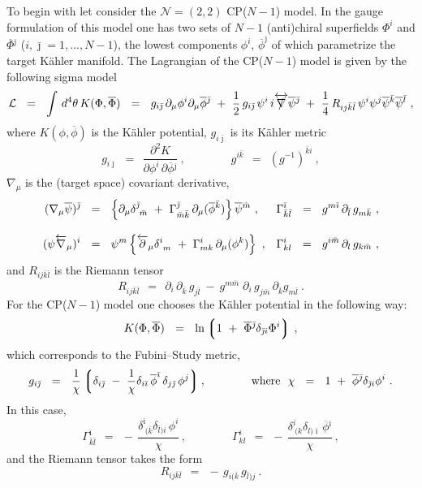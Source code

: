 \documentclass[12pt]{article}
\newcommand{\ntwot}{${\mathcal N}= \left(2,2\right) $ }
\newcommand{\p}{\partial}
\newcommand{\ov}{\overline}
\newcommand{\mc}[1]{\mathcal{#1}}
\newcommand{\lgr}{\left\lgroup}
\newcommand{\rgr}{\right\rgroup}
\def\slashed#1{\setbox0=\hbox{$#1$}             %
   \dimen0=\wd0                                 %
   \setbox1=\hbox{/} \dimen1=\wd1               %
   \ifdim\dimen0>\dimen1                        %
      \rlap{\hbox to \dimen0{\hfil/\hfil}}      %
      #1                                        %
   \else                                        %
      \rlap{\hbox to \dimen1{\hfil$#1$\hfil}}   %
      /                                         %
   \fi}                                        %
\newcommand{\bi}{{\bar \imath}}
\newcommand{\bj}{{\bar \jmath}}
\newcommand{\bk}{{\bar k}}
\newcommand{\bl}{{\bar l}}
\newcommand{\bm}{{\bar m}}
\begin{document}
To begin with let consider the \ntwot CP($N-1$) model.
In the gauge formulation of this model one has two sets of $ N - 1 $ (anti)chiral 
	superfields $ \Phi^i $ and $ \ov{\Phi}{}^\bj $ ($ i, \bj = 1,..., N-1 $), 
	the lowest components $ \phi^i $, $ \ov{\phi}^\bj $ of which parametrize the target K\"{a}hler
	manifold.
The Lagrangian of the CP($N-1$) model is given by the following sigma model
\[
	\mc{L} ~~=~~ \int\, d^4\theta\, K(\Phi,\ov{\Phi}) ~~=~~ g_{i\bj}\,\p_\mu \phi^i \p_\mu\ov{\phi}{}^\bj
		~+~ \frac{1}{2}\, g_{i\bj}\, \psi^i\, i\overleftrightarrow{\slashed{\nabla}} \ov{\psi}{}^\bj 
		~+~ \frac{1}{4}\, R_{ij\bk\bl}\, \psi^i\psi^j \ov{\psi}{}^\bk \ov{\psi}{}^\bl~,
\]
	where $ K(\phi,\ov{\phi}) $ is the K\"ahler potential, 
	$ g_{i\bj} $ is its K\"ahler metric
\[
	g_{i\bj} ~~=~~ \frac{\p^2 K}{\p\phi^i\,{\p\ov{\phi}{}^\bj}}~,
	\qquad\qquad
	g^{i\bk} ~~=~~ \left(g^{-1}\right)^{\bk i}~,
\]
	$ \nabla_\mu $ is  the (target space) covariant derivative,
\begin{align}
% 
\notag
	(\nabla_\mu \ov{\psi})^\bj & ~~=~~ \left\{ \p_\mu \delta^\bj_{\ \bm} ~+~
						\Gamma_{\bm\bk}^\bj\, \p_\mu(\ov{\phi}{}^\bk) \right\} \ov{\psi}{}^\bm~,
	& \Gamma^\bi_{\bk\bl} & ~~=~~ g^{m\bi}\,\p_\bl\, g_{m\bk}~,
	\\[3mm]
%
\label{covd}
	(\psi \overleftarrow{\nabla}{}_\mu)^i & ~~=~~ 
			\psi^m \left\{ \overleftarrow{\p}{}_\mu\delta^i_{\ m} ~+~
						\Gamma^i_{mk}\, \p_\mu(\phi^k) \right\}~,
	& \Gamma^i_{kl} & ~~=~~ g^{i\bm}\, \p_l\, g_{k\bm}~,
\end{align}
	and $ R_{ij\bk\bl} $ is the Riemann tensor 
\[
	R_{ij\bk\bl} ~~=~~ \p_i\,\p_\bk\, g_{j\bl} ~-~ g^{m\bm}\; \p_i\, g_{j\bm}\, \p_\bk g_{m\bl}~.
\]
	For the CP($N-1$) model one chooses the K\"ahler potential in the following way:
\[
	K(\Phi, \ov{\Phi}) ~~=~~ \ln \lgr 1 ~+~ \ov{\Phi}{}^\bj \delta_{\bj i} \Phi^i \rgr \,,
\]
	which corresponds to the Fubini--Study metric,
\[
	g_{i\bj} ~~=~~ \frac{1}{\chi}\lgr  \delta_{i\bj} ~-~ \frac{1}{\chi}
				  \delta_{i\bi}\,\ov{\phi}^\bi\, \delta_{j\bj}\,\phi^j \rgr,
	\qquad\qquad \text{where~~}
	\chi ~~=~~ 1 ~+~ \ov{\phi}{}^\bj \delta_{\bj i} \phi^i~.
\]
	In this case,
\[
	\Gamma^\bi_{\bk\bl} ~~=~~ -\, \frac{\delta^\bi_{\ (\bk} \delta_{\bl) i}\, \phi^i}{\chi}\,,  
	\qquad\qquad 
	\Gamma^i_{kl} ~~=~~ -\, \frac{\delta^i_{\ (k} \delta_{l)\bi}\,\ov{\phi}{}^\bi}{\chi}\,,
\]
	and the Riemann tensor takes the form
\[
	R_{ij\bk\bl} ~~=~~ -\,g_{i(\bk}\,g_{\bl)j}~.
\]
	
\end{document}
